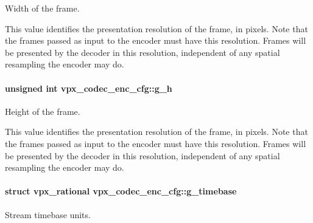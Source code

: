 \-Width of the frame. 

\-This value identifies the presentation resolution of the frame, in pixels. \-Note that the frames passed as input to the encoder must have this resolution. \-Frames will be presented by the decoder in this resolution, independent of any spatial resampling the encoder may do. \hypertarget{structvpx__codec__enc__cfg_a4132bd89ce85bce7c08f2cc3b6f2b82e}{
\paragraph[{g\-\_\-h}]{\setlength{\rightskip}{0pt plus 5cm}unsigned int {\bf vpx\-\_\-codec\-\_\-enc\-\_\-cfg\-::g\-\_\-h}}}\label{structvpx__codec__enc__cfg_a4132bd89ce85bce7c08f2cc3b6f2b82e}


\-Height of the frame. 

\-This value identifies the presentation resolution of the frame, in pixels. \-Note that the frames passed as input to the encoder must have this resolution. \-Frames will be presented by the decoder in this resolution, independent of any spatial resampling the encoder may do. \hypertarget{structvpx__codec__enc__cfg_a6498d378e4c29ef3e22258289e481087}{
\paragraph[{g\-\_\-timebase}]{\setlength{\rightskip}{0pt plus 5cm}struct {\bf vpx\-\_\-rational} {\bf vpx\-\_\-codec\-\_\-enc\-\_\-cfg\-::g\-\_\-timebase}}}\label{structvpx__codec__enc__cfg_a6498d378e4c29ef3e22258289e481087}


\-Stream timebase units. 

